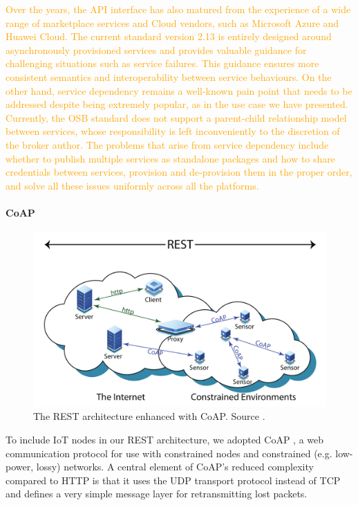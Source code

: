 \textcolor{orange}{Over the years, the API interface has also matured from the experience of a wide range of marketplace services and Cloud vendors, such as Microsoft Azure and Huawei Cloud. The current standard version 2.13 is entirely designed around asynchronously provisioned services and provides valuable guidance for challenging situations such as service failures. This guidance ensures more consistent semantics and interoperability between service behaviours.
On the other hand, service dependency remains a well-known pain point that needs to be addressed despite being extremely popular, as in the use case we have presented. Currently, the OSB standard does not support a parent-child relationship model between services, whose responsibility is left inconveniently to the discretion of the broker author. The problems that arise from service dependency include whether to publish multiple services as standalone packages and how to share credentials between services, provision and de-provision them in the proper order, and solve all these issues uniformly across all the platforms.}

\paragraph{CoAP}\label{sec:coap}

\begin{figure}[ht]
\centering
\includegraphics[width=\columnwidth]{figures/coap}
\caption{The REST architecture enhanced with CoAP. Source \cite{bormann2012coap}.}
\label{fig:coap}
\end{figure}

To include IoT nodes in our REST architecture, we adopted CoAP \cite{bormann2012coap}, a web communication protocol for use with constrained nodes and constrained (e.g. low-power, lossy) networks. A central element of CoAP's reduced complexity compared to HTTP is that it uses the UDP transport protocol instead of TCP and defines a very simple message layer for retransmitting lost packets.

